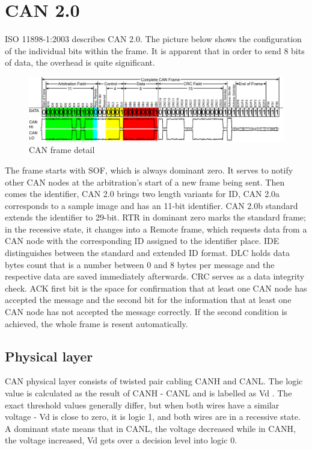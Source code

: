 \documentclass{ctuthesis}
\begin{document}
 \section{CAN 2.0}
  ISO 11898-1:2003 describes CAN 2.0. The picture below shows the configuration of the individual bits within the frame. It is apparent that in order to send 8 bits of data, the overhead is quite significant. 
  \begin{figure}[H]
  \includegraphics[width=1\textwidth]{CAN-Bus-frame_in_base_format_without_stuffbits}
  \caption{CAN frame detail \cite{can_frame}}
  \end{figure}
  The frame starts with SOF, which is always dominant zero. It serves to notify other CAN nodes at the arbitration’s start of a new frame being sent. Then comes the identifier, CAN 2.0 brings two length variants for ID, CAN 2.0a corresponds to a sample image and has an 11-bit identifier. CAN 2.0b standard extends the identifier to 29-bit. RTR in dominant zero marks the standard frame; in the recessive state, it changes into a Remote frame, which requests data from a CAN node with the corresponding ID assigned to the identifier place. IDE distinguishes between the standard and extended ID format. DLC holds data bytes count that is a number between 0 and 8 bytes per message and the respective data are saved immediately afterwards. CRC serves as a data integrity check. ACK first bit is the space for confirmation that at least one CAN node has accepted the message and the second bit for the information that at least one CAN node has not accepted the message correctly. If the second condition is achieved, the whole frame is resent automatically.
  \subsection{Physical layer}
   CAN physical layer consists of twisted pair cabling CANH and CANL. The logic value is calculated as the result of CANH - CANL and is labelled as Vd \cite{can_Vd}. The exact threshold values generally differ, but when both wires have a similar voltage - Vd is close to zero, it is logic 1, and both wires are in a recessive state. A dominant state means that in CANL, the voltage decreased while in CANH, the voltage increased, Vd gets over a decision level into logic 0.
\end{document}
